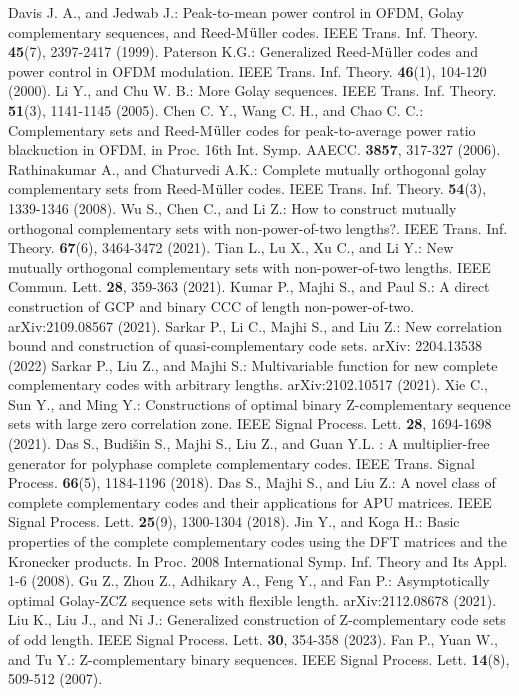 \documentclass[11pt]{article}
\newcommand{\2} {$2$-to-$1$}
\begin{document}
\begin{thebibliography}{1}
 Davis J. A.,  and Jedwab J.:  Peak-to-mean power control in OFDM,
Golay complementary sequences, and Reed-M$\rm\ddot{u}$ller codes. IEEE Trans.
Inf. Theory. \textbf{45}(7),  2397-2417  (1999).
 Paterson K.G.: Generalized Reed-M$\rm\ddot{u}$ller codes and power control in OFDM modulation. IEEE Trans. Inf. Theory. \textbf{46}(1), 104-120 (2000).
 Li Y.,  and Chu W. B.: More Golay sequences. IEEE Trans. Inf. Theory. \textbf{51}(3),  1141-1145  (2005).
 Chen C. Y., Wang C. H., and Chao C. C.:  Complementary sets and Reed-M$\rm\ddot{u}$ller codes for peak-to-average power ratio blackuction in OFDM. in Proc. 16th Int. Symp. AAECC. \textbf{3857},  317-327  (2006).
 Rathinakumar A.,  and Chaturvedi A.K.: Complete mutually orthogonal
golay complementary sets from Reed-M$\rm\ddot{u}$ller codes. IEEE Trans. Inf. Theory.  \textbf{54}(3), 1339-1346 (2008).
 Wu S., Chen C., and Li Z.: How to construct mutually orthogonal
complementary sets with non-power-of-two lengths?. IEEE Trans. Inf.
Theory. \textbf{67}(6), 3464-3472 (2021).
 Tian L., Lu X., Xu C., and Li Y.: New mutually orthogonal complementary sets with non-power-of-two lengths. IEEE Commun. Lett.  \textbf{28}, 359-363 (2021).
 Kumar P., Majhi S., and Paul S.: A direct construction of GCP and binary CCC of length non-power-of-two. arXiv:2109.08567 (2021).
 Sarkar P.,  Li C.,  Majhi S., and Liu Z.: New correlation bound and construction of quasi-complementary code sets. arXiv: 2204.13538 (2022)
 Sarkar P., Liu Z., and Majhi S.:  Multivariable function for new complete complementary codes with arbitrary lengths. arXiv:2102.10517 (2021).
	Xie C., Sun Y., and Ming Y.: Constructions of optimal binary Z-complementary sequence sets with large zero correlation zone.  IEEE Signal Process. Lett.  \textbf{28}, 1694-1698 (2021).
 Das S., Budi\v{s}in S., Majhi S.,  Liu Z., and Guan Y.L. :  A multiplier-free
generator for polyphase complete complementary codes. IEEE Trans. Signal Process. \textbf{66}(5), 1184-1196 (2018).
 Das S., Majhi S., and Liu Z.:  A novel class of complete complementary
codes and their applications for APU matrices. IEEE Signal Process.
Lett. \textbf{25}(9), 1300-1304 (2018).
 Jin Y.,  and Koga H.: Basic properties of the complete complementary codes using the DFT matrices and the Kronecker
products. In Proc. 2008 International Symp. Inf. Theory and Its Appl.  1-6 (2008).
 Gu Z., Zhou Z., Adhikary A., Feng Y., and Fan P.: Asymptotically optimal Golay-ZCZ sequence sets with flexible length. arXiv:2112.08678 (2021).
Liu K., Liu J., and Ni J.:  Generalized construction of Z-complementary code sets of odd length. IEEE Signal Process. Lett.  \textbf{30}, 354-358 (2023).
	Fan P., Yuan W., and Tu Y.: Z-complementary binary sequences. IEEE Signal Process. Lett. \textbf{14}(8), 509-512 (2007).


\end{thebibliography}
\end{document}
